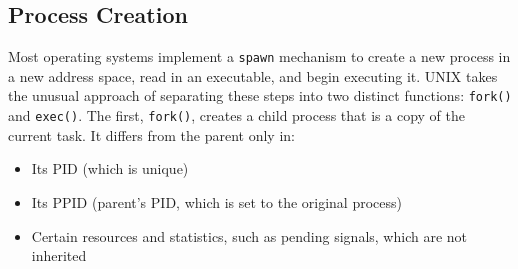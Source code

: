 \subsection{Process Creation}\label{subsec:Process_Creation}
Most operating systems implement a \texttt{spawn} mechanism to create a new process in a new address space, read in an executable, and begin executing it.
UNIX takes the unusual approach of separating these steps into two distinct functions: \texttt{fork()} and \texttt{exec()}.
The first, \texttt{fork()}, creates a child process that is a copy of the current task.
It differs from the parent only in:
\begin{itemize}[noitemsep]
\item Its PID (which is unique)
\item Its PPID (parent’s PID, which is set to the original process)
\item Certain resources and statistics, such as pending signals, which are not inherited
\end{itemize}


